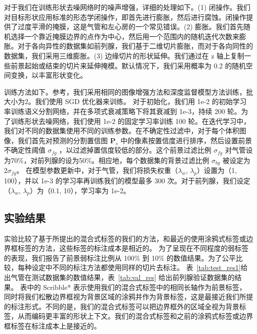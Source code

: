 对于我们在训练形状去噪网络时的噪声增强，详细的处理如下。(1) 闭操作。我们对目标形状应用标准的形态学闭操作，即首先进行膨胀，然后进行腐蚀。闭操作提供了过度平滑的掩膜，这是气管和左心房的一个常见错误。(2) 膨胀。我们首先随机选择一个靠近掩膜边界的点作为中心，然后用一个范围内的随机迭代次数来膨胀。对于各向异性的数据集如前列腺，我们基于二维切片膨胀，而对于各向同性的数据集，我们采用三维膨胀。(3) 边缘切片的形状延伸。我们通过在 z 轴上复制一些前景起始或结束的切片来延伸掩模。默认情况下，我们采用概率为 0.2 的随机空间变换，以丰富形状变化。

训练方法如下。参考\citet{isensee2019automated}，我们采用相同的图像增强方法和深度监督模型方法训练，批大小为2。我们使用 SGD 优化器来训练。
对于初始化，我们用 1e-2 的初始学习率训练语义分割网络，并在多项式衰减策略下将其衰减到 1e-3，持续 200 轮。为了训练形状去噪网络，我们使用 1e-2 的固定学习率训练 100 轮。在迭代学习中，我们对不同的数据集使用不同的训练参数。在不确定性过滤中，对于每个体积图像，我们首先对预测的分割置信图 $\mathbf{P}_s$ 中的像素按置信度进行排序，然后设置前景不确定性阈值 $\sigma_{fg}$ ，以过滤掉置信度较低的部分。这个前景过滤比例 $\sigma_{fg}$ 对气管设为70\%，对前列腺的设为50\%。相应地，每个数据集的背景过滤比例 $\sigma_{bg}$ 被设定为  $2\sigma_{fg}$。    %
在模型参数更新中，对于气管，我们将损失权重（$\lambda_w$, $\lambda_p$）设置为（1, 100），并以 1e-3 的学习率再训练我们的模型最多 300 次。对于前列腺，我们设定（$\lambda_w$, $\lambda_p$）为（0.1, 10），学习率为 1e-2。%


\subsection{实验结果} \label{sec:res1}

实验比较了基于所提出的混合式标签的我们的方法，和最近的使用涂鸦式标签或边界框标签的方法，这些标签的标注成本是相近的。
为了呈现在不同程度的弱标签的表现，我们报告了前景弱标注比例从 100\% 到 10\% 的数值结果。为了公平比较，每种设定中不同的标注方法都使用同样的切片去标注。
表~\ref{tab:test_res1}给出气管在测试数据集的数值结果，表~\ref{tab:val_res} 给出前列腺验证数据集的结果。%
表中的 Scribble* 表示使用我们的混合式标签中的相同长轴作为前景标签，同时将我们松散边界框视为背景区域的涂鸦并作为背景标签，这是最接近我们所提的标注形式。不同的是，我们的混合式标签可以把边界框外的区域全视为背景标签，从而编码更丰富的形状上下文。我们的混合式标签和之前的涂鸦式标签或边界框标签在标注成本上是接近的。

